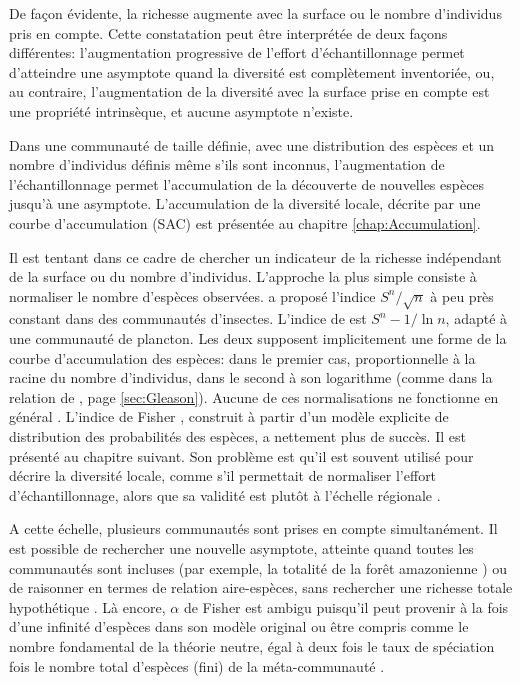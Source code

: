 \documentclass[
  11pt,
  french,
  a4paper,
  extrafontsizes,onecolumn,openright
  ]{memoir}
\begin{document}
\scriptsize

\normalsize

De façon évidente, la richesse augmente avec la surface ou le nombre d'individus pris en compte.
Cette constatation peut être interprétée de deux façons différentes: l'augmentation progressive de l'effort d'échantillonnage permet d'atteindre une asymptote quand la diversité est complètement inventoriée, ou, au contraire, l'augmentation de la diversité avec la surface prise en compte est une propriété intrinsèque, et aucune asymptote n'existe.

Dans une communauté de taille définie, avec une distribution des espèces et un nombre d'individus définis même s'ils sont inconnus, l'augmentation de l'échantillonnage permet l'accumulation de la découverte de nouvelles espèces jusqu'à une asymptote.
L'accumulation de la diversité locale, décrite par une courbe d'accumulation (SAC) est présentée au chapitre \ref{chap:Accumulation}.

Il est tentant dans ce cadre de chercher un indicateur de la richesse indépendant de la surface ou du nombre d'individus.
L'approche la plus simple consiste à normaliser le nombre d'espèces observées.
\textcite{Menhinick1964} a proposé l'indice \({S^{n}}/{\sqrt{n}}\) à peu près constant dans des communautés d'insectes.
L'indice de \textcite{Margalef1958a} est \({S^{n} -1}/{\ln{n}}\), adapté à une communauté de plancton.
Les deux supposent implicitement une forme de la courbe d'accumulation des espèces: dans le premier cas, proportionnelle à la racine du nombre d'individus, dans le second à son logarithme (comme dans la relation de \textcite{Gleason1922}, page \ref{sec:Gleason}).
Aucune de ces normalisations ne fonctionne en général \autocite[p.~77]{Magurran2004}.
L'indice de Fisher \autocite{Fisher1943}, construit à partir d'un modèle explicite de distribution des probabilités des espèces, a nettement plus de succès.
Il est présenté au chapitre suivant.
Son problème est qu'il est souvent utilisé pour décrire la diversité locale, comme s'il permettait de normaliser l'effort d'échantillonnage, alors que sa validité est plutôt à l'échelle régionale \autocite{Hubbell2001}.

A cette échelle, plusieurs communautés sont prises en compte simultanément.
Il est possible de rechercher une nouvelle asymptote, atteinte quand toutes les communautés sont incluses (par exemple, la totalité de la forêt amazonienne \autocite{TerSteege2013}) ou de raisonner en termes de relation aire-espèces, sans rechercher une richesse totale hypothétique \autocite{Preston1960}.
Là encore, \(\alpha\) de Fisher est ambigu puisqu'il peut provenir à la fois d'une infinité d'espèces dans son modèle original ou être compris comme le nombre fondamental de la théorie neutre, égal à deux fois le taux de spéciation fois le nombre total d'espèces (fini) de la méta-communauté \autocite{Hubbell2001}.
\end{document}
